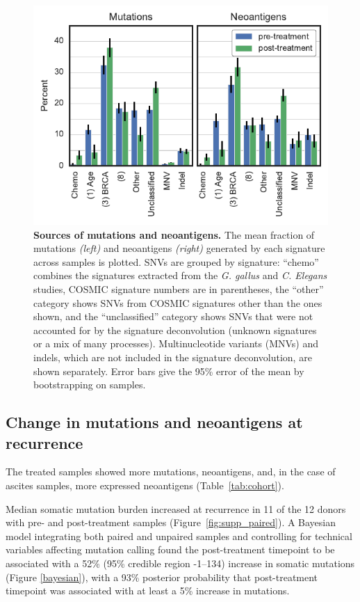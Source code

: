 \begin{figure}[htbp]
\centering
\includegraphics[scale=1.0]{figures/sources_of_mutations_and_neoantigens.pdf}
\caption{\textbf{Sources of mutations and neoantigens.}  The mean fraction of mutations \textit{(left)} and neoantigens \textit{(right)} generated by each signature across samples is plotted. SNVs are grouped by signature: ``chemo'' combines the signatures extracted from the \textit{G. gallus} and \textit{C. Elegans} studies, COSMIC signature numbers are in parentheses, the ``other'' category shows SNVs from COSMIC signatures other than the ones shown, and the ``unclassified'' category shows SNVs that were not accounted for by the signature deconvolution (unknown signatures or a mix of many processes). Multinucleotide variants (MNVs) and indels, which are not included in the signature deconvolution, are shown separately. Error bars give the 95\% error of the mean by bootstrapping on samples.}
\label{fig:sources}
\end{figure}

\subsection*{Change in mutations and neoantigens at recurrence}
The treated samples showed more mutations, neoantigens, and, in the case of ascites samples, more expressed neoantigens (Table~\ref{tab:cohort}).

Median somatic mutation burden increased at recurrence in 11 of the 12 donors with pre- and post-treatment samples (Figure~\ref{fig:supp_paired}). A Bayesian model integrating both paired and unpaired samples and controlling for technical variables affecting mutation calling found the post-treatment timepoint to be associated with a 52\% (95\% credible region -1--134) increase in somatic mutations (Figure \ref{bayesian}), with a 93\% posterior probability that post-treatment timepoint was associated with at least a 5\% increase in mutations.

